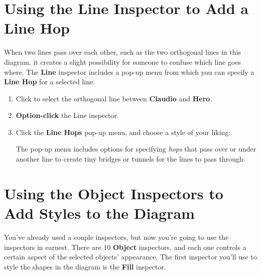\documentclass[../main.tex]{subfiles}
\begin{document}
\section{Using the Line Inspector to Add a Line Hop}

When two lines pass over each other, such as the two orthogonal lines in this diagram, it
creates a slight possibility for someone to confuse which line goes where. The \textbf{Line}
inspector includes a pop-up menu from which you can specify a \textbf{Line Hop} for a selected
line.

\begin{enumerate}
  \item Click to select the orthogonal line between \textbf{Claudio} and \textbf{Hero}.
  \item \textbf{Option-click} the Line inspector.
  \item Click the \textbf{Line Hops} pop-up menu, and choose a style of your liking:


    The pop-up menu includes options for specifying \textit{hops} that pass over or under another
    line to create tiny bridges or tunnels for the lines to pass through:

\end{enumerate}

\section{Using the Object Inspectors to Add Styles to the Diagram}

You've already used a couple inspectors, but now you're going to use the inspectors in earnest.
There are 10 \textbf{Object} inspectors, and each one controls a certain aspect of the
selected objects' appearance. The first inspector you'll use to style the shapes in the
diagram is the \textbf{Fill} inspector.
\end{document}
